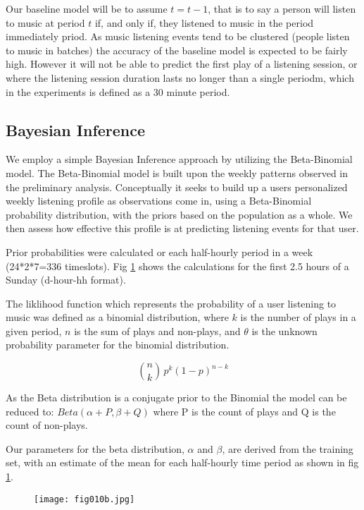 Our baseline model will be to assume $t = t-1$, that is to say a person will listen to music at period $t$ if, and only if, they listened to music in the period immediately priod. As music listening events tend to be clustered (people listen to music in batches) the accuracy of the baseline model is expected to be fairly high. However it will not be able to predict the first play of a listening session, or where the listening session duration lasts no longer than a single periodm, which in the experiments is defined as a 30 minute period.

\subsection{Bayesian Inference}

We employ a simple Bayesian Inference approach by utilizing the Beta-Binomial model. The Beta-Binomial model is built upon the weekly patterns observed in the preliminary analysis. Conceptually it seeks to build up a users personalized weekly listening profile as observations come in, using a Beta-Binomial probability distribution, with the priors based on the population as a whole. We then assess how effective this profile is at predicting listening events for that user.

Prior probabilities were calculated or each half-hourly period in a week (24*2*7=336 timeslots). Fig \ref{fig10b} shows the calculations for the first 2.5 hours of a Sunday (d-hour-hh format). 

The liklihood function which represents the probability of a user listening to music was defined as a binomial distribution, where $k$ is the number of plays in a given period, $n$ is the sum of plays and non-plays, and $\theta$ is the unknown probability parameter for the binomial distribution.

$${n \choose k}\,p^{k}(1-p)^{n-k}$$

As the Beta distribution is a conjugate prior to the Binomial the model can be reduced to: $Beta(\alpha+P, \beta+Q)$ where P is the count of plays and Q is the count of non-plays.

Our parameters for the beta distribution, $\alpha$ and $\beta$, are derived from the training set, with an estimate of the mean for each half-hourly time period as shown in fig \ref{fig10b}. 

\begin{figure}[h!]
	\centering
	\texttt{[image: fig010b.jpg]}
	\caption{}
	\label{fig10b}
\end{figure} 

